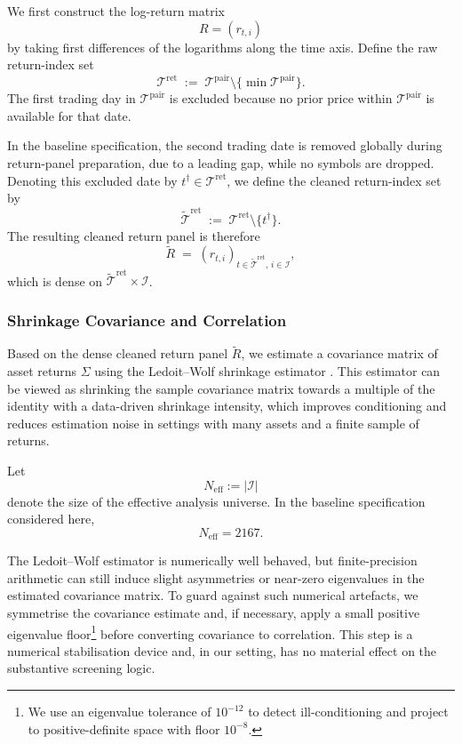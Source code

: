 \documentclass[11pt,a4paper]{article}
\begin{document}
We first construct the log-return matrix
\[
  R = (r_{t,i})
\]
by taking first differences of the logarithms along the time axis. Define the
raw return-index set
\[
  \mathcal{T}^{\mathrm{ret}}
  \;:=\;
  \mathcal{T}^{\mathrm{pair}}\setminus\{\min \mathcal{T}^{\mathrm{pair}}\}.
\]
The first trading day in \(\mathcal{T}^{\mathrm{pair}}\) is excluded because no
prior price within \(\mathcal{T}^{\mathrm{pair}}\) is available for that date.

In the baseline specification, the second trading date is removed
globally during return-panel preparation, due to a leading gap, while no symbols are dropped.
Denoting this excluded date by \(t^\dagger \in \mathcal{T}^{\mathrm{ret}}\), we define the cleaned return-index set by
\[
  \widetilde{\mathcal{T}}^{\mathrm{ret}}
  \;:=\;
  \mathcal{T}^{\mathrm{ret}} \setminus \{t^\dagger\}.
\]
The resulting cleaned return panel is therefore
\[
  \widetilde R
  \;=\;
  (r_{t,i})_{t\in \widetilde{\mathcal{T}}^{\mathrm{ret}},\, i\in\mathcal I},
\]
which is dense on \(\widetilde{\mathcal{T}}^{\mathrm{ret}} \times \mathcal I\).

\subsubsection{Shrinkage Covariance and Correlation}

Based on the dense cleaned return panel \(\widetilde R\), we estimate a
covariance matrix of asset returns \(\Sigma\) using the Ledoit--Wolf shrinkage
estimator \cite{ledoit2004well}. This estimator can be viewed as shrinking the
sample covariance matrix towards a multiple of the identity with a data-driven
shrinkage intensity, which improves conditioning and reduces estimation noise in
settings with many assets and a finite sample of returns.

Let
\[
N_{\text{eff}} := |\mathcal I|
\]
denote the size of the effective analysis universe. In the baseline
specification considered here,
\[
N_{\text{eff}} = 2167.
\]

The Ledoit--Wolf estimator is numerically well behaved, but finite-precision
arithmetic can still induce slight asymmetries or near-zero eigenvalues in the
estimated covariance matrix. To guard against such numerical artefacts, we
symmetrise the covariance estimate and, if necessary, apply a small positive
eigenvalue floor\footnote{We use 
an eigenvalue tolerance of $10^{-12}$ to detect ill-conditioning 
and project to positive-definite space with floor $10^{-8}$.} before converting covariance to correlation. This step is a
numerical stabilisation device and, in our setting, has no material effect on
the substantive screening logic.
\end{document}
